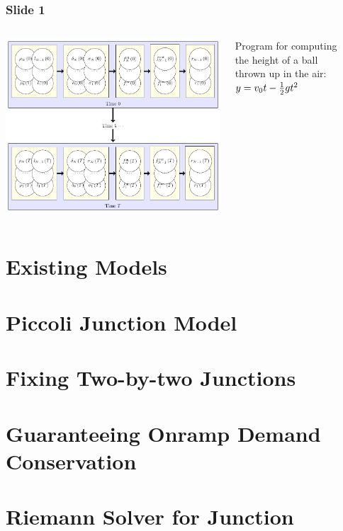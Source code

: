 \documentclass{beamer}
\begin{document}
\begin{frame}
\frametitle{Slide 1}


\begin{columns}

\centerline{\includegraphics[width=0.800000\linewidth,keepaspectratio]{triangletikzpdf.pdf}}

\begin{block}


Program for computing the height of a ball thrown up in the air:
$y=v_0t- {1\over 2} gt^2$

\end{block}
\begin{block}





\end{block}

\end{columns}

\end{frame}

\section{Existing Models}


\section{Piccoli Junction Model}


\section{Fixing Two-by-two Junctions}


\section{Guaranteeing Onramp Demand Conservation}


\section{Riemann Solver for Junction}
\end{document}
